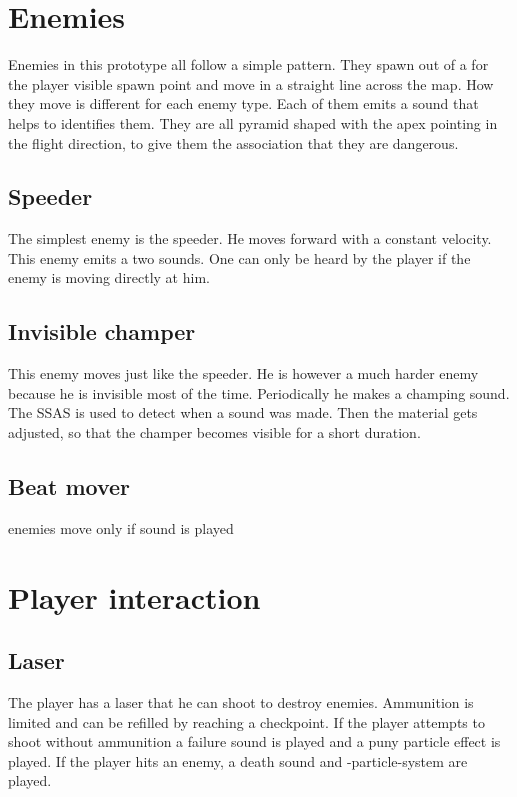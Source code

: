 \section{Enemies}
Enemies in this prototype all follow a simple pattern. They spawn out of a for the player visible spawn point and move in a straight line across the map. How they move is different for each enemy type. Each of them emits a sound that helps to identifies them. They are all pyramid shaped with the apex pointing in the flight direction, to give them the association that they are dangerous.


\subsection{Speeder}
The simplest enemy is the speeder. He moves forward with a constant velocity. This enemy emits a two sounds. One can only be heard by the player if the enemy is moving directly at him.



\subsection{Invisible champer}\label{InvisibleChamper}
This enemy moves just like the speeder. He is however a much harder enemy because he is invisible most of the time. Periodically he makes a champing sound. The SSAS is used to detect when a sound was made. Then the material gets adjusted, so that the champer becomes visible for a short duration.



\subsection{Beat mover}
enemies move only if sound is played



\section{Player interaction}
\subsection{Laser}
The player has a laser that he can shoot to destroy enemies. Ammunition is limited and can be refilled by reaching a checkpoint. If the player attempts to shoot without ammunition a failure sound is played and a puny particle effect is played. If the player hits an enemy, a death sound and -particle-system are played.

